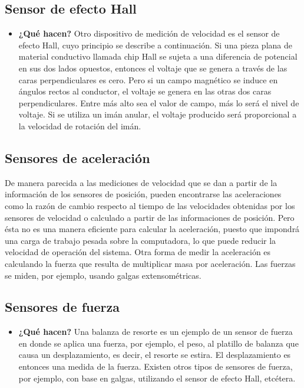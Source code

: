 \vspace{10cm}

\subsection*{Sensor de efecto Hall}
\begin{itemize}
	\item \textbf{¿Qué hacen?} Otro dispositivo de medición de velocidad es el sensor de efecto Hall, cuyo principio se describe a continuación. Si una pieza plana de material conductivo llamada chip Hall se sujeta a una diferencia de potencial en sus dos lados opuestos, entonces el voltaje que se genera a través de las caras perpendiculares es cero. Pero si un campo magnético se induce en ángulos rectos al conductor, el voltaje se genera en las otras dos caras perpendiculares. Entre más alto sea el valor de campo, más lo será el nivel de voltaje. Si se utiliza un imán anular, el voltaje producido será proporcional a la velocidad de rotación del imán. \cite{TE_Connectivity_Sensor}

\end{itemize}

	\begin{figure}[h]
	\centering
\end{figure}


\subsection{Sensores de aceleración} De manera parecida a las mediciones de velocidad que se dan a partir de la información de los sensores de posición, pueden encontrarse las aceleraciones como la razón de cambio respecto al tiempo de las velocidades obtenidas por los sensores de velocidad o calculado a partir de las informaciones de posición. Pero ésta no es una manera eficiente para calcular la aceleración, puesto que impondrá una carga de trabajo pesada sobre la computadora, lo que puede reducir la velocidad de operación del sistema. Otra forma de medir la aceleración es calculando la fuerza que resulta de multiplicar masa por aceleración. Las fuerzas se miden, por ejemplo, usando galgas extensométricas. 

\subsection*{Sensores de fuerza} 
\begin{itemize}
	\item \textbf{¿Qué hacen?} Una balanza de resorte es un ejemplo de un sensor de fuerza en donde se aplica una fuerza, por ejemplo, el peso, al platillo de balanza que causa un desplazamiento, es decir, el resorte se estira. El desplazamiento es entonces una medida de la fuerza. Existen otros tipos de sensores de fuerza, por ejemplo, con base en galgas, utilizando el sensor de efecto Hall, etcétera. 
\end{itemize}
